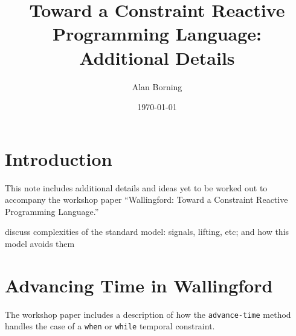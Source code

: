 \documentclass{article}
\begin{document}
\title{Toward a Constraint Reactive Programming Language: \\ 
 Additional Details} 

\author{Alan Borning} \date{\today}

\maketitle

\section{Introduction}

This note includes additional details and ideas yet to be worked out
to accompany the workshop paper ``Wallingford: Toward a Constraint
Reactive Programming Language.''

discuss complexities of the standard model: signals, lifting, etc; and how
this model avoids them

\section{Advancing Time in Wallingford}
\label{sec:advancing-time}

The workshop paper includes a description of how the
\verb|advance-time| method handles the case of a \verb|when| or
\verb|while| temporal constraint.
\end{document}
